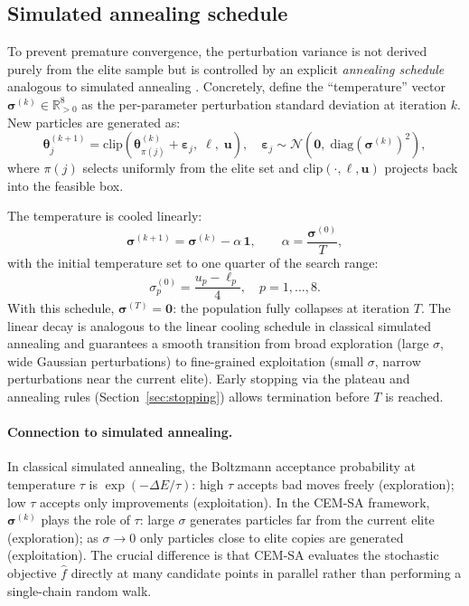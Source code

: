 \documentclass[12pt,a4paper]{article}
\newcommand{\pars}{\bm{\theta}}
\newcommand{\lb}{\bm{\ell}}
\newcommand{\ub}{\mathbf{u}}
\newcommand{\fhat}{\widehat{f}}
\newcommand{\R}{\mathbb{R}}
\begin{document}
\subsection{Simulated annealing schedule}\label{sec:annealing}

To prevent premature convergence, the perturbation variance is not derived
purely from the elite sample but is controlled by an explicit
\emph{annealing schedule} analogous to simulated annealing
\citep{kirkpatrick1983optimization}. Concretely, define the ``temperature''
vector $\bm{\sigma}^{(k)} \in \R^8_{>0}$ as the per-parameter perturbation
standard deviation at iteration $k$. New particles are generated as:
\begin{equation}\label{eq:perturb}
  \pars_j^{(k+1)} = \mathrm{clip}\!\left(
    \pars_{\pi(j)}^{(k)} + \bm{\varepsilon}_j,\; \lb,\; \ub\right),
  \quad
  \bm{\varepsilon}_j \sim \mathcal{N}\!\left(\mathbf{0},\;
    \mathrm{diag}\!\left(\bm{\sigma}^{(k)}\right)^2\right),
\end{equation}
where $\pi(j)$ selects uniformly from the elite set and
$\mathrm{clip}(\cdot,\lb,\ub)$ projects back into the feasible box.

The temperature is cooled linearly:
\begin{equation}\label{eq:anneal}
  \bm{\sigma}^{(k+1)} = \bm{\sigma}^{(k)} - \alpha\,\mathbf{1},
  \qquad
  \alpha = \frac{\bm{\sigma}^{(0)}}{T},
\end{equation}
with the initial temperature set to one quarter of the search range:
\begin{equation}\label{eq:sigma0}
  \sigma_p^{(0)} = \frac{u_p - \ell_p}{4}, \quad p = 1,\ldots, 8.
\end{equation}
With this schedule, $\bm{\sigma}^{(T)} = \mathbf{0}$: the population fully
collapses at iteration $T$. The linear decay is analogous to the linear
cooling schedule in classical simulated annealing and guarantees a smooth
transition from broad exploration (large $\sigma$, wide Gaussian
perturbations) to fine-grained exploitation (small $\sigma$, narrow
perturbations near the current elite). Early stopping via the plateau and
annealing rules (Section~\ref{sec:stopping}) allows termination before
$T$ is reached.

\paragraph{Connection to simulated annealing.}
In classical simulated annealing, the Boltzmann acceptance probability at
temperature $\tau$ is $\exp(-\Delta E / \tau)$: high $\tau$ accepts bad
moves freely (exploration); low $\tau$ accepts only improvements
(exploitation). In the CEM-SA framework, $\bm{\sigma}^{(k)}$ plays the role
of $\tau$: large $\sigma$ generates particles far from the current elite
(exploration); as $\sigma \to 0$ only particles close to elite copies are
generated (exploitation). The crucial difference is that CEM-SA evaluates
the stochastic objective $\fhat$ directly at many candidate points in
parallel rather than performing a single-chain random walk.
\end{document}
